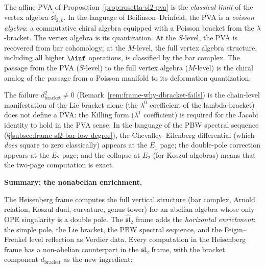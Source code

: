 \begin{remark}
\label{rem:rosetta-quantization}
The affine PVA of Proposition~\ref{prop:rosetta-sl2-pva} is the
\emph{classical limit} of the vertex algebra
$\widehat{\mathfrak{sl}}_{2,k}$. In the language of
Beilinson--Drinfeld, the PVA is a \emph{coisson algebra}: a
commutative chiral algebra equipped with a Poisson bracket from
the $\lambda$-bracket. The vertex algebra is its quantization.
At the $S$-level, the PVA is recovered from bar cohomology; at the
$M$-level, the full vertex algebra
structure, including all higher $\Ainf$ operations, is classified by the bar complex. The passage
from the PVA ($S$-level) to the full vertex algebra ($M$-level)
is the chiral analog of the passage from a Poisson manifold to
its deformation quantization.
\end{remark}

\begin{remark}
\label{rem:rosetta-dbracket-pva}
The failure $d_{\mathrm{bracket}}^2 \neq 0$
(Remark~\ref{rem:frame-why-dbracket-fails}) is the chain-level
manifestation of the Lie bracket alone (the $\lambda^0$
coefficient of the lambda-bracket) does not define a PVA: the
Killing form ($\lambda^1$ coefficient) is required for the Jacobi
identity to hold in the PVA sense. In the language of the PBW
spectral sequence (\S\ref{subsec:frame-sl2-bar-low-degree}), the
Chevalley--Eilenberg differential (which \emph{does} square to zero
classically) appears at the $E_1$ page; the double-pole correction
appears at the $E_2$ page; and the collapse at $E_2$ (for Koszul
algebras) means that the two-page computation is exact.
\end{remark}

\bigskip
\noindent\textbf{Summary: the nonabelian enrichment.}

The Heisenberg frame computes the full vertical structure (bar
complex, Arnold relation, Koszul dual, curvature, genus tower) for
an abelian algebra whose only OPE singularity is a double pole.
The $\widehat{\mathfrak{sl}}_2$ frame adds the \emph{horizontal
enrichment}: the simple pole, the Lie bracket, the PBW spectral
sequence, and the Feigin--Frenkel level reflection as Verdier data.
Every computation in the Heisenberg frame has a non-abelian
counterpart in the $\mathfrak{sl}_2$ frame, with the bracket
component $d_{\mathrm{bracket}}$ as the new ingredient:

